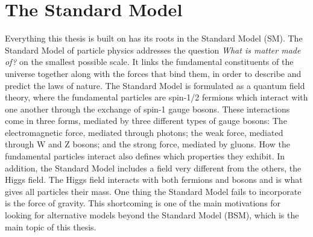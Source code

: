 \chapter{The Standard Model}
Everything this thesis is built on has its roots in the Standard Model (SM). The Standard Model of particle physics addresses the question \emph{What is matter made of?} on the smallest possible scale. It links the fundamental constituents of the universe together along with the forces that bind them, in order to describe and predict the laws of nature. The Standard Model is formulated as a quantum field theory, where the fundamental particles are spin-1/2 fermions which interact with one another through the exchange of spin-1 gauge bosons. These interactions come in three forms, mediated by three different types of gauge bosons: The electromagnetic force, mediated through photons; the weak force, mediated through W and Z bosons; and the strong force, mediated by gluons. How the fundamental particles interact also defines which properties they exhibit. In addition, the Standard Model includes a field very different from the others, the Higgs field. The Higgs field interacts with both fermions and bosons and is what gives all particles their mass.\newline
One thing the Standard Model fails to incorporate is the force of gravity. This shortcoming is one of the main motivations for looking for alternative models beyond the Standard Model (BSM), which is the main topic of this thesis.

